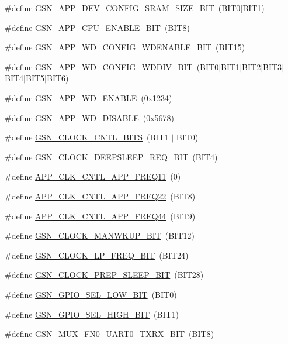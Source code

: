 \begin{DoxyCompactItemize}
\item 
\#define \hyperlink{a00546_adf6d9784141898661f0dbdfbc5f527df}{GSN\_\-APP\_\-DEV\_\-CONFIG\_\-SRAM\_\-SIZE\_\-BIT}~(BIT0$|$BIT1)
\item 
\#define \hyperlink{a00546_ab3fd74d92d5b2029dc783f42ca37c225}{GSN\_\-APP\_\-CPU\_\-ENABLE\_\-BIT}~(BIT8)
\item 
\#define \hyperlink{a00546_a64457565ac402518d7b8c923a5b66911}{GSN\_\-APP\_\-WD\_\-CONFIG\_\-WDENABLE\_\-BIT}~(BIT15)
\item 
\#define \hyperlink{a00546_a4c5de9dd616e4beaacb9217d444e1433}{GSN\_\-APP\_\-WD\_\-CONFIG\_\-WDDIV\_\-BIT}~(BIT0$|$BIT1$|$BIT2$|$BIT3$|$BIT4$|$BIT5$|$BIT6)
\item 
\#define \hyperlink{a00546_a51137468e7f638ad3bedb94e1c8c5fef}{GSN\_\-APP\_\-WD\_\-ENABLE}~(0x1234)
\item 
\#define \hyperlink{a00546_ac0e30ce4e4bb977a9fc9dc561ca60d82}{GSN\_\-APP\_\-WD\_\-DISABLE}~(0x5678)
\item 
\#define \hyperlink{a00546_a23ea0d4f06860ff4450bd89d05d149ab}{GSN\_\-CLOCK\_\-CNTL\_\-BITS}~(BIT1 $|$ BIT0)
\item 
\#define \hyperlink{a00546_aecd9922fd7dfed622b6a0270429b5e28}{GSN\_\-CLOCK\_\-DEEPSLEEP\_\-REQ\_\-BIT}~(BIT4)
\item 
\#define \hyperlink{a00546_a73a6a6c6808a42d514ebb67c1063268e}{APP\_\-CLK\_\-CNTL\_\-APP\_\-FREQ11}~(0)
\item 
\#define \hyperlink{a00546_a0cd1f0a0f83703beab3a59c5b2f64ad8}{APP\_\-CLK\_\-CNTL\_\-APP\_\-FREQ22}~(BIT8)
\item 
\#define \hyperlink{a00546_ab49ba667ee7e8ca380e91ada4a135cfe}{APP\_\-CLK\_\-CNTL\_\-APP\_\-FREQ44}~(BIT9)
\item 
\#define \hyperlink{a00546_ad9d6d2e4125c438a32dff2d2bb92ef3b}{GSN\_\-CLOCK\_\-MANWKUP\_\-BIT}~(BIT12)
\item 
\#define \hyperlink{a00546_a9b7cafb9f60d107358d79d47b68a2a69}{GSN\_\-CLOCK\_\-LP\_\-FREQ\_\-BIT}~(BIT24)
\item 
\#define \hyperlink{a00546_aa17fa9e026642ba7486c31044579b8b4}{GSN\_\-CLOCK\_\-PREP\_\-SLEEP\_\-BIT}~(BIT28)
\item 
\#define \hyperlink{a00546_a10c97d83066ca170009edcfea8dc2d8b}{GSN\_\-GPIO\_\-SEL\_\-LOW\_\-BIT}~(BIT0)
\item 
\#define \hyperlink{a00546_a217d8012431ebcdd4791f4e1a4aabc72}{GSN\_\-GPIO\_\-SEL\_\-HIGH\_\-BIT}~(BIT1)
\item 
\#define \hyperlink{a00546_a126c472b35db6e984665c6e6eefba2dc}{GSN\_\-MUX\_\-FN0\_\-UART0\_\-TXRX\_\-BIT}~(BIT8)

\end{DoxyCompactItemize}

